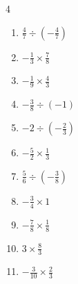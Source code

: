 \begin{multicols}{4}
\begin{enumerate}

  \item $\displaystyle \frac{4}{7}\div{}\left(-\frac{4}{7}\right)$

        \phantom{$\displaystyle =-1$}

  \item $\displaystyle -\frac{1}{3}\times{}\frac{7}{8}$


  \item $\displaystyle -\frac{1}{9}\times{}\frac{4}{3}$


\columnbreak %

  \item $\displaystyle -\frac{3}{8}\div{}\left(-1\right)$


  \item $\displaystyle -2\div{}\left(-\frac{2}{3}\right)$

        \phantom{$\displaystyle =3$}

  \item $\displaystyle -\frac{5}{2}\times{}\frac{1}{3}$


  \item $\displaystyle \frac{5}{6}\div{}\left(-\frac{3}{8}\right)$


  \item $\displaystyle -\frac{3}{4}\times{}1$


  \item $\displaystyle -\frac{7}{8}\times{}\frac{1}{8}$


  \item $\displaystyle 3\times{}\frac{8}{3}$

        \phantom{$\displaystyle =8$}

  \item $\displaystyle -\frac{3}{10}\times{}\frac{2}{3}$



\end{enumerate}
\end{multicols}
